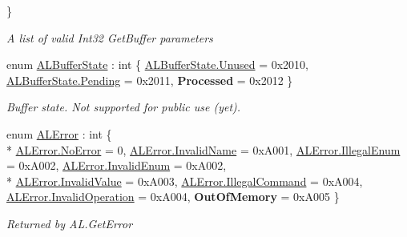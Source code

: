 \begin{DoxyCompactItemize}
 \}
\begin{DoxyCompactList}\small\item\em A list of valid Int32 Get\-Buffer parameters\end{DoxyCompactList}\item 
enum \hyperlink{namespace_open_t_k_1_1_audio_1_1_open_a_l_a656c3dc44316f6bb4f8873f841bf39f4}{A\-L\-Buffer\-State} \-: int \{ \hyperlink{namespace_open_t_k_1_1_audio_1_1_open_a_l_a656c3dc44316f6bb4f8873f841bf39f4a92e592d90b9548016776a6fb68dccded}{A\-L\-Buffer\-State.\-Unused} = 0x2010, 
\hyperlink{namespace_open_t_k_1_1_audio_1_1_open_a_l_a656c3dc44316f6bb4f8873f841bf39f4a2d13df6f8b5e4c5af9f87e0dc39df69d}{A\-L\-Buffer\-State.\-Pending} = 0x2011, 
{\bfseries Processed} = 0x2012
 \}
\begin{DoxyCompactList}\small\item\em Buffer state. Not supported for public use (yet).\end{DoxyCompactList}\item 
enum \hyperlink{namespace_open_t_k_1_1_audio_1_1_open_a_l_aeaa7464f886ab881a2631e5a028421e4}{A\-L\-Error} \-: int \{ \\*
\hyperlink{namespace_open_t_k_1_1_audio_1_1_open_a_l_aeaa7464f886ab881a2631e5a028421e4a70a47cae4eb221930f2663fd244369ea}{A\-L\-Error.\-No\-Error} = 0, 
\hyperlink{namespace_open_t_k_1_1_audio_1_1_open_a_l_aeaa7464f886ab881a2631e5a028421e4aa798c6c805d93fedf99d9bdf443e7ffc}{A\-L\-Error.\-Invalid\-Name} = 0x\-A001, 
\hyperlink{namespace_open_t_k_1_1_audio_1_1_open_a_l_aeaa7464f886ab881a2631e5a028421e4a2bb71971d3733e525d6966c293ef39fa}{A\-L\-Error.\-Illegal\-Enum} = 0x\-A002, 
\hyperlink{namespace_open_t_k_1_1_audio_1_1_open_a_l_aeaa7464f886ab881a2631e5a028421e4abaf0777e3144a52d6fd69816f4ac22c8}{A\-L\-Error.\-Invalid\-Enum} = 0x\-A002, 
\\*
\hyperlink{namespace_open_t_k_1_1_audio_1_1_open_a_l_aeaa7464f886ab881a2631e5a028421e4a223e81e8afa42c41346a6696560ecc7b}{A\-L\-Error.\-Invalid\-Value} = 0x\-A003, 
\hyperlink{namespace_open_t_k_1_1_audio_1_1_open_a_l_aeaa7464f886ab881a2631e5a028421e4a47c1481731910df3950e1b093cbb8216}{A\-L\-Error.\-Illegal\-Command} = 0x\-A004, 
\hyperlink{namespace_open_t_k_1_1_audio_1_1_open_a_l_aeaa7464f886ab881a2631e5a028421e4a1cd5ecce6fe138df5c3f7e8854a1a66d}{A\-L\-Error.\-Invalid\-Operation} = 0x\-A004, 
{\bfseries Out\-Of\-Memory} = 0x\-A005
 \}
\begin{DoxyCompactList}\small\item\em Returned by A\-L.\-Get\-Error\end{DoxyCompactList}\item 

\end{DoxyCompactItemize}

